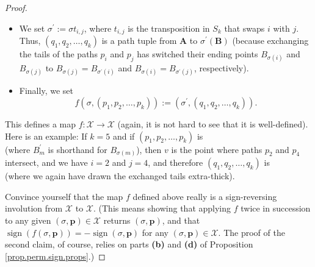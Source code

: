 \begin{definition}
\begin{proof}
\begin{itemize}
\item We set $\sigma^{\prime}:=\sigma t_{i,j}$, where $t_{i,j}$ is the
transposition in $S_{k}$ that swaps $i$ with $j$. Thus, $\left(  q_{1}%
,q_{2},\ldots,q_{k}\right)  $ is a path tuple from $\mathbf{A}$ to
$\sigma^{\prime}\left(  \mathbf{B}\right)  $ (because exchanging the tails of
the paths $p_{i}$ and $p_{j}$ has switched their ending points $B_{\sigma
\left(  i\right)  }$ and $B_{\sigma\left(  j\right)  }$ to $B_{\sigma\left(
j\right)  }=B_{\sigma^{\prime}\left(  i\right)  }$ and $B_{\sigma\left(
i\right)  }=B_{\sigma^{\prime}\left(  j\right)  }$, respectively).

\item Finally, we set%
\[
f\left(  \sigma,\left(  p_{1},p_{2},\ldots,p_{k}\right)  \right)  :=\left(
\sigma^{\prime},\left(  q_{1},q_{2},\ldots,q_{k}\right)  \right)  .
\]

\end{itemize}

This defines a map $f:\mathcal{X}\rightarrow\mathcal{X}$ (again, it is not
hard to see that it is well-defined). Here is an example: If $k=5$ and if
$\left(  p_{1},p_{2},\ldots,p_{k}\right)  $ is%
\[%
\]
(where $B_{m}^{\prime}$ is shorthand for $B_{\sigma\left(  m\right)  }$), then
$v$ is the point where paths $p_{2}$ and $p_{4}$ intersect, and we have $i=2$
and $j=4$, and therefore $\left(  q_{1},q_{2},\ldots,q_{k}\right)  $ is%
\[%
\]
(where we again have drawn the exchanged tails extra-thick).

Convince yourself that the map $f$ defined above really is a sign-reversing
involution from $\mathcal{X}$ to $\mathcal{X}$. (This means showing that
applying $f$ twice in succession to any given $\left(  \sigma,\mathbf{p}%
\right)  \in\mathcal{X}$ returns $\left(  \sigma,\mathbf{p}\right)  $, and
that $\operatorname*{sign}\left(  f\left(  \sigma,\mathbf{p}\right)  \right)
=-\operatorname*{sign}\left(  \sigma,\mathbf{p}\right)  $ for any $\left(
\sigma,\mathbf{p}\right)  \in\mathcal{X}$. The proof of the second claim, of
course, relies on parts \textbf{(b)} and \textbf{(d)} of Proposition
\ref{prop.perm.sign.props}.)


\end{proof}
\end{definition}
